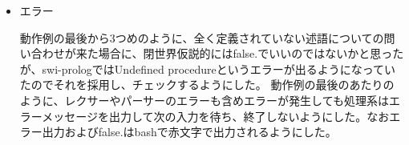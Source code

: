\documentclass[11pt,a4paper]{jsarticle}
\begin{document}
\begin{itemize}
\begin{lstlisting}[basicstyle=\ttfamily\footnotesize, frame=single]
list:
  | NIL { ENil }
  | LBRACKET atomics RBRACKET { $2 }
;
\end{lstlisting}
出力も、カンマを出力すべきかどうかをパターンマッチで場合わけして以下のように書くことができた。
\begin{lstlisting}[basicstyle=\ttfamily\footnotesize, frame=single]
let rec print_term t = 
  match t with
  | EFnSymb (id,tl) -> print_name id;
                       if tl=[] then ()
                                else (print_string "(";
                                      print_term_list tl;
                                      print_string ")")
  | EVar id -> print_name id
  | ECons (x,y) -> print_list t
  | ENil -> print_string "[]"
  | EConst x -> print_name x 
and print_term_list tl = 
  match tl with
  | [] -> ()
  | t::rest -> print_term t;
               (if (rest <> []) then (print_string ",") 
                                else ());
               print_term_list rest
and print_list t =
  print_string "[";
  print_list_inner t;
  print_string "]"
and print_list_inner t =
  match t with
  | ECons (x,(ECons(y,z))) -> print_term x;
  		   	  print_string ", ";
  		   	  print_list_inner (ECons (y,z))
  | ECons (x,ENil) -> print_term x
  | ECons (x,y) -> print_term x;
  		   print_string " | ";
  		   print_term y
  | _ -> () (* Error *)
\end{lstlisting}
	\item エラー\par
	動作例の最後から3つめのように、全く定義されていない述語についての問い合わせが来た場合に、閉世界仮説的にはfalse.でいいのではないかと思ったが、swi-prologではUndefined procedureというエラーが出るようになっていたのでそれを採用し、チェックするようにした。
	動作例の最後のあたりのように、レクサーやパーサーのエラーも含めエラーが発生しても処理系はエラーメッセージを出力して次の入力を待ち、終了しないようにした。なおエラー出力およびfalse.はbashで赤文字で出力されるようにした。
\end{itemize}
\end{document}
